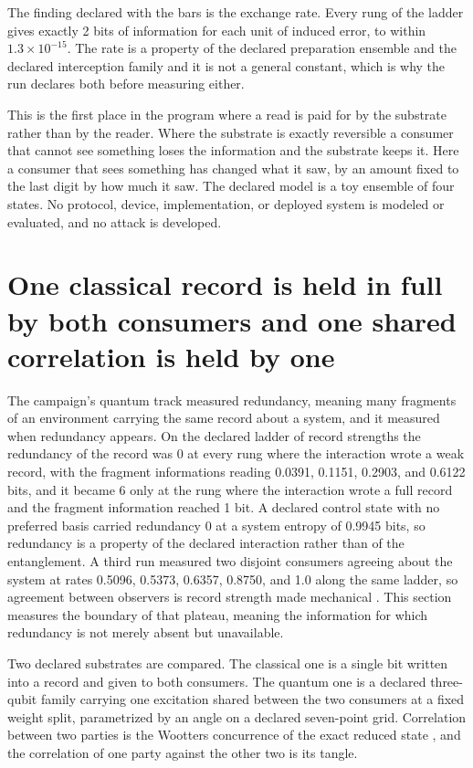 \documentclass[aps,pre,reprint,nofootinbib]{revtex4-2}
\begin{document}
The finding declared with the bars is the exchange rate.  Every rung
of the ladder gives exactly 2 bits of information for each unit of
induced error, to within $1.3 \times 10^{-15}$.  The rate is a
property of the declared preparation ensemble and the declared
interception family and it is not a general constant, which is why the
run declares both before measuring either.

This is the first place in the program where a read is paid for by the
substrate rather than by the reader.  Where the substrate is exactly
reversible a consumer that cannot see something loses the information
and the substrate keeps it.  Here a consumer that sees something has changed
what it saw, by an amount fixed to the last digit by how much it saw.
The declared model is a toy ensemble of four states.  No protocol,
device, implementation, or deployed system is modeled or evaluated,
and no attack is developed.

\section{One classical record is held in full by both consumers and
one shared correlation is held by one}
\label{sec:cr7}

The campaign's quantum track measured redundancy, meaning many
fragments of an environment carrying the same record about a system,
and it measured when redundancy appears.  On the declared ladder of
record strengths the redundancy of the record was 0 at every rung
where the interaction wrote a weak record, with the fragment
informations reading 0.0391, 0.1151, 0.2903, and 0.6122 bits, and it
became 6 only at the rung where the interaction wrote a full record
and the fragment information reached 1 bit.  A declared control state
with no preferred basis carried redundancy 0 at a system entropy of
0.9945 bits, so redundancy is a property of the declared interaction
rather than of the entanglement.  A third run measured two disjoint
consumers agreeing about the system at rates 0.5096, 0.5373, 0.6357,
0.8750, and 1.0 along the same ladder, so agreement between observers
is record strength made mechanical \cite{Gen2Paper}.  This section
measures the boundary of that plateau, meaning the information for
which redundancy is not merely absent but unavailable.

Two declared substrates are compared.  The classical one is a single
bit written into a record and given to both consumers.  The quantum
one is a declared three-qubit family carrying one excitation shared
between the two consumers at a fixed weight split, parametrized by an
angle on a declared seven-point grid.  Correlation between two parties
is the Wootters concurrence of the exact reduced state
\cite{Wootters1998}, and the correlation of one party against the
other two is its tangle.
\end{document}
